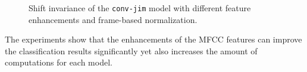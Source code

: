 \FloatBarrier
\noindent
\begin{figure}[!ht]
  \centering
  \quad
  \caption{Shift invariance of the \texttt{conv-jim} model with different feature enhancements and frame-based normalization.}
  \label{fig:exp_fs_mfcc_tb_shift_conv-jim}
\end{figure}
\FloatBarrier
\noindent
The experiments show that the enhancements of the MFCC features can improve the classification results significantly yet also increases the amount of computations for each model.